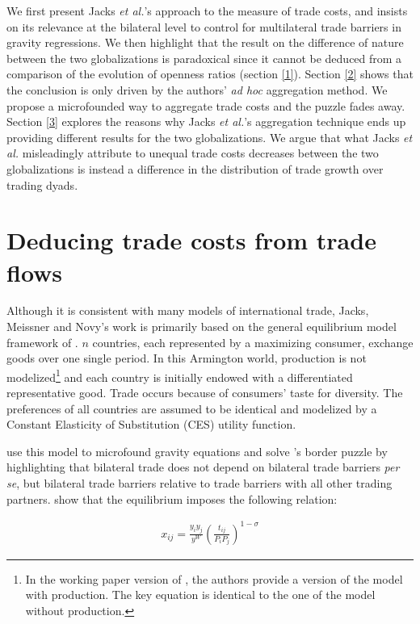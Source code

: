 \documentclass{article}
\begin{document}
We first present Jacks \textit{et al.}'s approach to the
measure of trade costs, and insists on its relevance at the
bilateral level to control for multilateral trade barriers in
gravity regressions. We then highlight that the
result on the difference of nature between the two globalizations
is paradoxical since it cannot be deduced from a comparison of the
evolution of openness ratios (section \ref{1}). Section \ref{2} shows that the
conclusion is only driven by the authors' \textit{ad hoc} aggregation
method. We propose a microfounded way to aggregate trade costs
and the puzzle fades away. Section \ref{3} explores the reasons
why Jacks \textit{et al.}'s aggregation technique ends up providing
different results for the two globalizations. We argue that
what Jacks \textit{et al.} misleadingly attribute to unequal trade costs
decreases between the two globalizations is instead a
difference in the distribution of trade growth over trading
dyads.

\section{\label{1} Deducing trade costs from trade flows}

Although it is consistent with many models of international
trade, Jacks, Meissner and Novy's work is primarily based on
the general equilibrium model framework of \cite{AW2003}. $n$
countries, each represented by a maximizing consumer, exchange
goods over one single period. In this Armington world,
production is not modelized\footnote{In the working paper
version of \cite{JMN2010}, the authors provide a version of the
model with production. The key equation is identical to the one
of the model without production.} and each country is initially
endowed with a differentiated representative good. Trade occurs
because of consumers' taste for diversity. The preferences of
all countries are assumed to be identical and modelized by a
Constant Elasticity of Substitution (CES) utility function.

\cite{AW2003} use this model to microfound gravity equations
and solve \cite{MAC}'s border puzzle by highlighting that
bilateral trade does not depend on bilateral trade barriers \textit{per
se}, but bilateral trade barriers relative to trade barriers with all other trading partners. \cite{AW2003} show that the
equilibrium imposes the following relation:

\begin{eqnarray}
x_{ij}=\frac{y_i y_j}{y^W}\left(\frac{t_{ij}}{P_i P_j}\right)^{1-\sigma}
\end{eqnarray}
\end{document}
